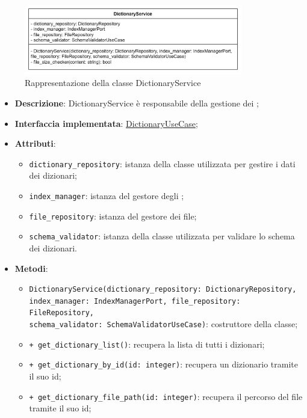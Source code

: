  \label{DictionaryService}
\begin{figure}[H]
    \centering
    \includegraphics[width=0.85\textwidth]{assets/Backend/dictionary_service.png}
    \caption{Rappresentazione della classe DictionaryService}
  \end{figure}
\begin{itemize}
    \item \textbf{Descrizione}: DictionaryService è responsabile della gestione dei ;
    \item \textbf{Interfaccia implementata}: \hyperref[DictionaryUseCase]{DictionaryUseCase};
    \item \textbf{Attributi}:
    \begin{itemize}
        \item \texttt{dictionary\_repository}: istanza della classe utilizzata per gestire i dati dei dizionari;
        \item \texttt{index\_manager}: istanza del gestore degli ;
        \item \texttt{file\_repository}: istanza del gestore dei file;
        \item \texttt{schema\_validator}: istanza della classe utilizzata per validare lo schema dei dizionari.
    \end{itemize}
    \item \textbf{Metodi}:
    \begin{itemize}
        \item \texttt{DictionaryService(dictionary\_repository: DictionaryRepository,\\ index\_manager: IndexManagerPort, file\_repository: FileRepository,\\ schema\_validator: SchemaValidatorUseCase)}: costruttore della classe;
        \item \texttt{+ get\_dictionary\_list()}: recupera la lista di tutti i dizionari;
        \item \texttt{+ get\_dictionary\_by\_id(id: integer)}: recupera un dizionario tramite il suo id;
        \item \texttt{+ get\_dictionary\_file\_path(id: integer)}: recupera il percorso del file tramite il suo id;

\end{itemize}
\end{itemize}
